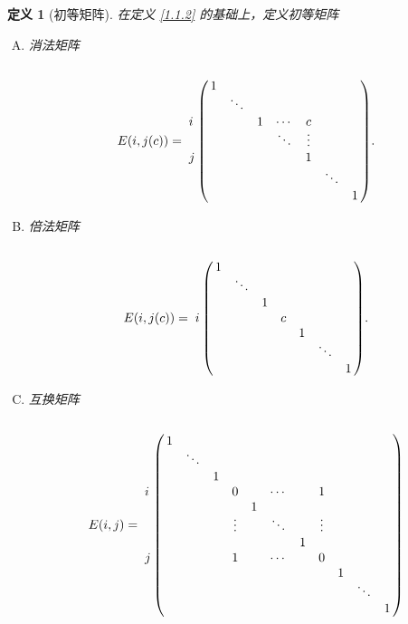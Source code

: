\documentclass[10pt,openany]{article}
\theoremstyle{thmstyle} %
\theoremstyle{defstyle} %
\newtheorem{definition}[theorem]{定义}
\theoremstyle{prostyle} %
\begin{document}
\begin{definition}[初等矩阵]
	在定义 \ref{1.1.2} 的基础上，定义初等矩阵
	\begin{enumerate}[(A)]
		\item 消法矩阵
		\[ E(i,j(c))=\bordermatrix{
			& & & & & & & \cr
			& 1 & & & & & &  \cr
			& & \ddots & & & & &  \cr
		\textbf{\(i\)}	& & & 1 & \cdots & c & &  \cr
			& & & & \ddots & \vdots & &  \cr
		\textbf{\(j\)}	& & & & & 1 & &  \cr
			& & & & & & \ddots  &  \cr
			& & & & & & & 1 \cr
		}. \]
		\item 倍法矩阵
		\[ E(i,j(c))=\bordermatrix{
			& & & & & & &  \cr
			& 1 & & & &  & &  \cr
			& & \ddots & & &  & &  \cr
			& & & 1 & &  & &  \cr
			\textbf{\(i\)}	& & & & c & & &   \cr
			& &  & & & 1  & &  \cr
			& & & &  & &\ddots &  \cr
			& & & & & & & 1   \cr
		}. \]
		\item 互换矩阵
		\[
		E(i,j) = \bordermatrix{
			&       &       &       &       &       &       &       &       &       &       &       \cr
			& 1     &       &       &       &       &       &       &       &       &       &       \cr
			&       & \ddots&       &       &       &       &       &       &       &       &       \cr
			&       &       & 1     &       &       &       &       &       &       &       &       \cr
			\textbf{\(i\)} &  &       &       & 0     &       & \cdots&       & 1     &       &       &       \cr
			&       &       &       &       & 1     &       &       &       &       &       &       \cr
			&       &       &       & \vdots&       & \ddots&       & \vdots&       &       &       \cr
			&       &       &       &       &       &       & 1     &       &       &       &       \cr
			\textbf{\(j\)} &  &       &       & 1     &       & \cdots&       & 0     &       &       &       \cr
			&       &       &       &       &       &       &       &       & 1     &       &       \cr
			&       &       &       &       &       &       &       &       &       & \ddots&       \cr
			&       &       &       &       &       &       &       &       &       &       & 1     
		}
		\]
		
	\end{enumerate}
\end{definition}
\end{document}
